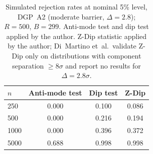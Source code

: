 \clearpage
\begin{table}[p]
\centering
\caption{Simulated rejection rates at nominal 5\% level, DGP~A2
(moderate barrier, $\Delta=2.8$); $R=500$, $B=299$.
Anti-mode test and dip test applied by the author.
Z-Dip statistic \citep{ZDip2025} applied by the author;
Di~Martino et~al.\ validate Z-Dip only on distributions with
component separation $\geq 8\sigma$ and report no results for
$\Delta=2.8\sigma$.}
\label{tab:power}
\begin{tabular}{lccc}
\toprule
$n$ & Anti-mode test & Dip test & Z-Dip\\
\midrule
 250 & 0.000 & 0.100 & 0.086\\
 500 & 0.000 & 0.216 & 0.194\\
1000 & 0.000 & 0.396 & 0.372\\
5000 & 0.688 & 0.998 & 0.998\\
\bottomrule
\end{tabular}
\end{table}
